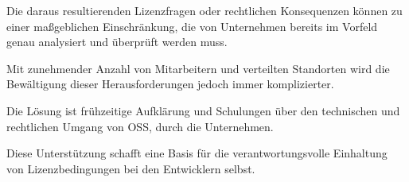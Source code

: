 Die daraus resultierenden Lizenzfragen oder rechtlichen Konsequenzen können zu einer maßgeblichen Einschränkung, die von Unternehmen bereits im Vorfeld genau analysiert und überprüft werden muss.  

Mit zunehmender Anzahl von Mitarbeitern und verteilten Standorten wird die Bewältigung dieser Herausforderungen jedoch immer komplizierter. 

Die Lösung ist frühzeitige Aufklärung und Schulungen über den technischen und rechtlichen Umgang von OSS, durch die Unternehmen. 

Diese Unterstützung schafft eine Basis für die verantwortungsvolle Einhaltung von Lizenzbedingungen bei den Entwicklern selbst. 

